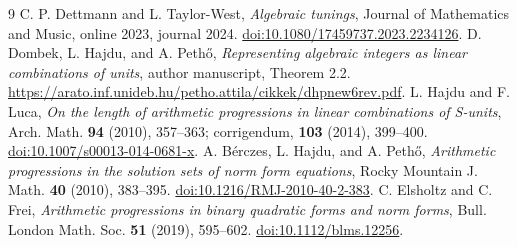 \documentclass[11pt]{article}
\begin{document}
\begin{thebibliography}{9}
 C. P. Dettmann and L. Taylor-West, \emph{Algebraic tunings}, Journal of Mathematics and Music, online 2023, journal 2024. \href{https://doi.org/10.1080/17459737.2023.2234126}{doi:10.1080/17459737.2023.2234126}.
 D. Dombek, L. Hajdu, and A. Peth\H{o}, \emph{Representing algebraic integers as linear combinations of units}, author manuscript, Theorem 2.2. \url{https://arato.inf.unideb.hu/petho.attila/cikkek/dhpnew6rev.pdf}.
 L. Hajdu and F. Luca, \emph{On the length of arithmetic progressions in linear combinations of S-units}, Arch. Math. \textbf{94} (2010), 357--363; corrigendum, \textbf{103} (2014), 399--400. \href{https://doi.org/10.1007/s00013-014-0681-x}{doi:10.1007/s00013-014-0681-x}.
 A. B\'erczes, L. Hajdu, and A. Peth\H{o}, \emph{Arithmetic progressions in the solution sets of norm form equations}, Rocky Mountain J. Math. \textbf{40} (2010), 383--395. \href{https://doi.org/10.1216/RMJ-2010-40-2-383}{doi:10.1216/RMJ-2010-40-2-383}.
 C. Elsholtz and C. Frei, \emph{Arithmetic progressions in binary quadratic forms and norm forms}, Bull. London Math. Soc. \textbf{51} (2019), 595--602. \href{https://doi.org/10.1112/blms.12256}{doi:10.1112/blms.12256}.
\end{thebibliography}
\end{document}
